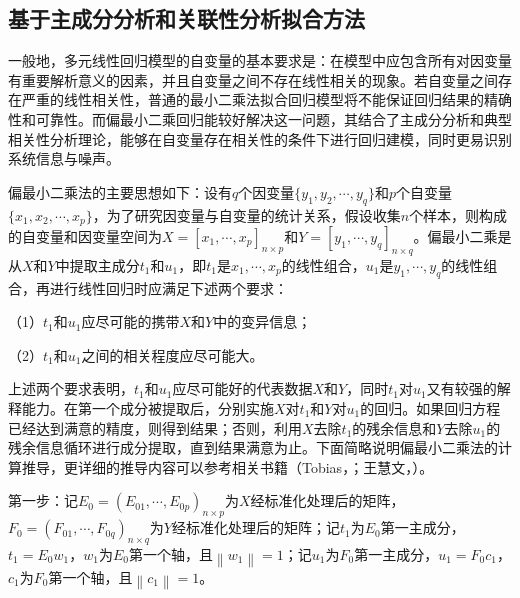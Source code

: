 \subsection{基于主成分分析和关联性分析拟合方法}

一般地，多元线性回归模型的自变量的基本要求是：在模型中应包含所有对因变量有重要解析意义的因素，并且自变量之间不存在线性相关的现象。若自变量之间存在严重的线性相关性，普通的最小二乘法拟合回归模型将不能保证回归结果的精确性和可靠性。而偏最小二乘回归能较好解决这一问题，其结合了主成分分析和典型相关性分析理论，能够在自变量存在相关性的条件下进行回归建模，同时更易识别系统信息与噪声。

偏最小二乘法的主要思想如下：设有$q$个因变量$\{{{y}_{1}},{{y}_{2}},\cdots ,{{y}_{q}}\}$和$p$个自变量$\{{{x}_{1}},{{x}_{2}},\cdots ,{{x}_{p}}\}$，为了研究因变量与自变量的统计关系，假设收集$n$个样本，则构成的自变量和因变量空间为$X={{[{{x}_{1}},\cdots ,{{x}_{p}}]}_{n\times p}}$和$Y={{[{{y}_{1}},\cdots ,{{y}_{q}}]}_{n\times q}}$。偏最小二乘是从$X$和$Y$中提取主成分$t_1$和$u_1$，即$t_1$是${{x}_{1}},\cdots ,{{x}_{p}}$的线性组合，$u_1$是${{y}_{1}},\cdots ,{{y}_{q}}$的线性组合，再进行线性回归时应满足下述两个要求：

（1）$t_1$和$u_1$应尽可能的携带$X$和$Y$中的变异信息；

（2）$t_1$和$u_1$之间的相关程度应尽可能大。

上述两个要求表明，$t_1$和$u_1$应尽可能好的代表数据$X$和$Y$，同时$t_1$对$u_1$又有较强的解释能力。在第一个成分被提取后，分别实施$X$对$t_1$和$Y$对$u_1$的回归。如果回归方程已经达到满意的精度，则得到结果；否则，利用$X$去除$t_1$的残余信息和$Y$去除$u_1$的残余信息循环进行成分提取，直到结果满意为止。下面简略说明偏最小二乘法的计算推导，更详细的推导内容可以参考相关书籍（Tobias，\citeyear{tobias1995introduction}；王慧文，\citeyear{王惠文1999偏最小二乘回归方法及其应用}）。

第一步：记${{E}_{0}}={{({{E}_{01}},\cdots ,{{E}_{0p}})}_{n\times p}}$为$X$经标准化处理后的矩阵，${{F}_{0}}={{({{F}_{01}},\cdots ,{{F}_{0q}})}_{n\times q}}$为$Y$经标准化处理后的矩阵；记$t_1$为${{E}_{0}}$第一主成分，$t_1={E_0}{w_1}$，$w_1$为$E_0$第一个轴，且$\left\| {{w}_{1}} \right\|=1$；记$u_1$为${{F}_{0}}$第一主成分，$u_1={F_0}{c_1}$，$c_1$为$F_0$第一个轴，且$\left\| {{c}_{1}} \right\|=1$。

